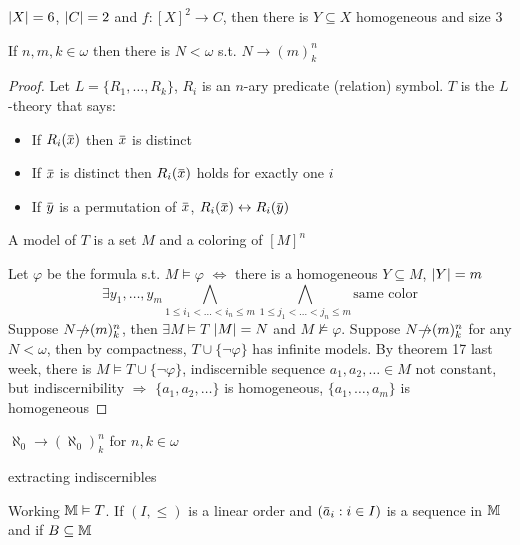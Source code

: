 \documentclass[11pt]{article}
\begin{document}
\begin{fact}
\(\abs{X}=6\), \(\abs{C}=2\) and \(f:[X]^2\to C\), then there is \(Y\subseteq X\) homogeneous and size 3
\end{fact}

\begin{theorem}
If \(n,m,k\in\omega\) then there is \(N<\omega\) s.t. \(N\to(m)^n_k\)
\end{theorem}

\begin{proof}
Let \(L=\{R_1,\dots,R_k\}\), \(R_i\) is an \(n\)-ary predicate (relation) symbol. \(T\) is
the \(L\)-theory that says:
\begin{itemize}
\item If \(R_i(\barx)\) then \(\barx\) is distinct
\item If \(\barx\) is distinct then \(R_i(\barx)\) holds for exactly one \(i\)
\item If \(\bary\) is a permutation of \(\barx\), \(R_i(\barx)\leftrightarrow R_i(\bary)\)
\end{itemize}


A model of \(T\) is a set \(M\) and a coloring of \([M]^n\)

Let \(\varphi\) be the formula s.t. \(M\vDash\varphi\) \(\Leftrightarrow\) there is a homogeneous \(Y\subseteq M\), \(\abs{Y}=m\)
\begin{equation*}
\exists y_1,\dots,y_m\bigwedge_{1\le i_1<\dots<i_n\le m}\bigwedge_{1\le j_1<\dots<j_n\le m}\text{same color}
\end{equation*}
Suppose \(N\slashed{\to}(m)^n_k\), then \(\exists M\vDash T\) \(\abs{M}=N\) and \(M\not\vDash\varphi\).
Suppose \(N\slashed{\to}(m)^n_k\) for any \(N<\omega\), then by compactness, \(T\cup\{\neg\varphi\}\) has infinite
models. By theorem 17 last week, there is \(M\vDash T\cup\{\neg\varphi\}\), indiscernible sequence  \(a_1,a_2,\dots\in M\)
not constant, but indiscernibility \(\Rightarrow\) \(\{a_1,a_2,\dots\}\) is homogeneous, \(\{a_1,\dots,a_m\}\) is homogeneous
\end{proof}

\begin{fact}
\(\aleph_0\to(\aleph_0)^n_k\) for \(n,k\in\omega\)
\end{fact}

extracting indiscernibles

Working \(\mathbb{M}\vDash T\). If \((I,\le)\) is a linear order and \((\bara_i:i\in I)\) is a sequence in \(\mathbb{M}\)
and if \(B\subseteq\mathbb{M}\)
\end{document}
